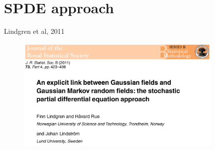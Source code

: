 \documentclass{beamer}
\begin{document}
\section{SPDE approach}

\begin{frame}{Lindgren et al, 2011} 
  \begin{figure}[h]
    \begin{center}
      \includegraphics[width=0.9\textwidth]{figures/lindgren.png}
    \end{center}
  \end{figure}
\end{frame}

%
%
%
\end{document}
